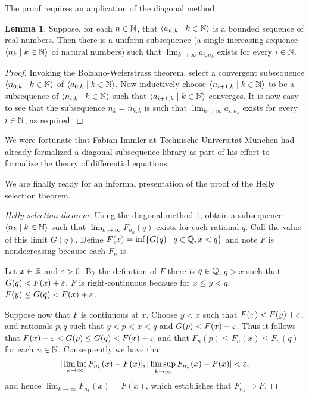 \documentclass{article}
\theoremstyle{definition}
\newtheorem{lemma}[theorem]{Lemma}
\newcommand{\bldset}[2]{\{{#1}\mid{#2}\}}
\newcommand{\bldseq}[2]{\langle{#1}\mid{#2}\rangle}
\begin{document}
The proof requires an application of the diagonal method.

\begin{lemma} \label{lem:diag}
Suppose, for each $n \in \mathbb{N}$, that $\bldseq{a_{n,k}}{k \in \N}$ is a bounded sequence of real numbers. Then there is a uniform subsequence (a single increasing sequence $\bldseq{n_k}{k \in \N}$ of natural numbers) such that $\lim_{k \rightarrow \infty} a_{i,n_k}$ exists for every $i \in \mathbb{N}$.
\end{lemma}

\begin{proof}
Invoking the Bolzano-Weierstrass theorem, select a convergent subsequence $\bldseq{n_{0,k}}{k \in \N}$ of $\bldseq{a_{0,k}}{k \in \N}$. Now inductively choose $\bldseq{n_{i+1,k}}{k \in \N}$ to be a subsequence of $\bldseq{n_{i,k}}{k \in \N}$ such that $\bldseq{a_{i+1,k}}{k \in \N}$ converges. It is now easy to see that the subsequence $n_k = n_{k,k}$ is such that $\lim_{k \rightarrow \infty} a_{i,n_k}$ exists for every $i \in \mathbb{N}$, as required.
\end{proof}

We were fortunate that Fabian Immler at Technische Universit\"at M\"unchen had already formalized a diagonal subsequence library as part of his effort to formalize the theory of differential equations.

We are finally ready for an informal presentation of the proof of the Helly selection theorem.

\begin{proof}[Helly selection theorem]
Using the diagonal method \ref{lem:diag}, obtain a subsequence $\bldseq{n_k}{k \in \N}$ such that $\lim_{k \rightarrow \infty} F_{n_k}(q)$ exists for each rational $q$. Call the value of this limit $G(q)$. Define $F(x) = \inf \bldset{G(q)}{q \in \Q, x < q}$ and note $F$ is nondecreasing because each $F_n$ is.

Let $x \in \mathbb{R}$ and $\varepsilon > 0$. By the definition of $F$ there is $q \in \mathbb{Q}$, $q > x$ such that $G(q) < F(x) + \varepsilon$. $F$ is right-continuous because for $x \le y < q$, $F(y) \le G(q) < F(x) + \varepsilon$.

Suppose now that $F$ is continuous at $x$. Choose $y < x$ such that $F(x) < F(y) + \varepsilon$, and rationals $p,q$ such that $y < p < x < q$ and $G(p) < F(x) + \varepsilon$. Thus it follows that $F(x) - \varepsilon < G(p) \le G(q) < F(x) + \varepsilon$ and that $F_n(p) \le F_n(x) \le F_n(q)$ for each $n \in \mathbb{N}$. Consequently we have that
\[ |\liminf_{k \rightarrow \infty} F_{n_k}(x) - F(x)|, |\limsup_{k \rightarrow \infty} F_{n_k}(x) - F(x)| < \varepsilon, \]
and hence $\lim_{k \rightarrow \infty} F_{n_k}(x) = F(x)$, which establishes that $F_{n_k} \Rightarrow F$.
\end{proof}
\end{document}
